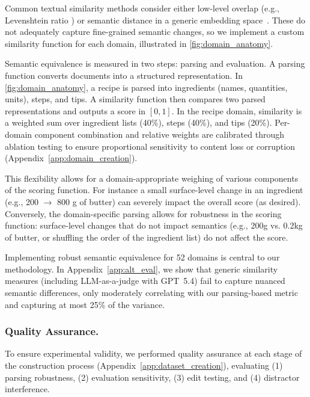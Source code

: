 \documentclass{article} %
\begin{document}
Common textual similarity methods consider either low-level overlap (e.g., Levenshtein ratio \citep{Levenshtein1965BinaryCC}) or semantic distance in a generic embedding space~\citep{Neelakantan2022TextAC}. These do not adequately capture fine-grained semantic changes, so we implement a custom similarity function for each domain, illustrated in \autoref{fig:domain_anatomy}.

Semantic equivalence is measured in two steps: parsing and evaluation. A parsing function converts documents into a structured representation. In \autoref{fig:domain_anatomy}, a recipe is parsed into ingredients (names, quantities, units), steps, and tips. A similarity function then compares two parsed representations and outputs a score in $[0, 1]$. In the recipe domain, similarity is a weighted sum over ingredient lists (40\%), steps (40\%), and tips (20\%). Per-domain component combination and relative weights are calibrated through ablation testing to ensure proportional sensitivity to content loss or corruption (Appendix~\ref{app:domain_creation}).

This flexibility allows for a domain-appropriate weighing of various components of the scoring function. For instance a small surface-level change in an ingredient (e.g., 200 $\to$ 800 g of butter) can severely impact the overall score (as desired). Conversely, the domain-specific parsing allows for robustness in the scoring function: surface-level changes that do not impact semantics (e.g., 200g vs. 0.2kg of butter, or shuffling the order of the ingredient list) do not affect the score.

Implementing robust semantic equivalence for 52 domains is central to our methodology. In Appendix~\ref{app:alt_eval}, we show that generic similarity measures (including LLM-as-a-judge with GPT~5.4) fail to capture nuanced semantic differences, only moderately correlating with our parsing-based metric and capturing at most 25\% of the variance.

\subsubsection{Quality Assurance.} \label{sec:benchmark_qa}

To ensure experimental validity, we performed quality assurance at each stage of the construction process (Appendix~\ref{app:dataset_creation}), evaluating (1) parsing robustness, (2) evaluation sensitivity, (3) edit testing, and (4) distractor interference.
\end{document}
